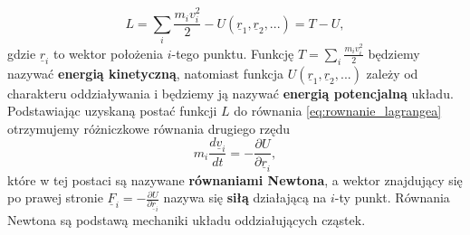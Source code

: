 \documentclass[12pt,a4paper,openright]{report} %
\begin{document}
\begin{equation}
L=\sum\limits_{i} \frac{m_i v_i^2}{2} - U(\underline{r}_1, \underline{r}_2, ...)=T-U,
\end{equation}
gdzie $\underline{r}_i$ to wektor położenia $i$-tego punktu. Funkcję $T = \sum\limits_{i} \frac{m_i v_i^2}{2}$ będziemy nazywać \textbf{energią kinetyczną}, natomiast funkcja $U(\underline{r}_1, \underline{r}_2, ...)$ zależy od charakteru oddziaływania i będziemy ją nazywać \textbf{energią potencjalną} układu.\\
Podstawiając uzyskaną postać funkcji $L$ do równania \ref{eq:rownanie_lagrangea} otrzymujemy różniczkowe równania drugiego rzędu
\begin{equation}
m_i \frac{d \underline{v}_i}{dt}=-\frac{\partial U}{\partial \underline{r}_i},
\end{equation}
które w tej postaci są nazywane \textbf{równaniami Newtona}, a wektor znajdujący się po prawej stronie $\underline{F}_i = -\frac{\partial U}{\partial \underline{r}_i}$ nazywa się \textbf{siłą} działającą na $i$-ty punkt. Równania Newtona są podstawą mechaniki układu oddziałujących cząstek.
\end{document}
